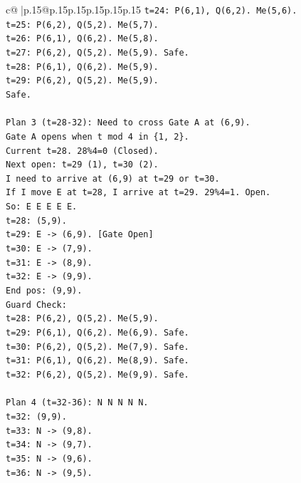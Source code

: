 \documentclass{article}
\begin{document}
{\begin{supertabular}{c@{$\;$}|p{.15\linewidth}@{}p{.15\linewidth}p{.15\linewidth}p{.15\linewidth}p{.15\linewidth}p{.15\linewidth}}
{{{\texttt{t=24: P(6,1), Q(6,2). Me(5,6).} \\
\texttt{t=25: P(6,2), Q(5,2). Me(5,7).} \\
\texttt{t=26: P(6,1), Q(6,2). Me(5,8).} \\
\texttt{t=27: P(6,2), Q(5,2). Me(5,9). Safe.} \\
\texttt{t=28: P(6,1), Q(6,2). Me(5,9).} \\
\texttt{t=29: P(6,2), Q(5,2). Me(5,9).} \\
\texttt{Safe.} \\
\\ 
\texttt{Plan 3 (t=28{-}32): Need to cross Gate A at (6,9).} \\
\texttt{Gate A opens when t mod 4 in \{1, 2\}.} \\
\texttt{Current t=28. 28\%4=0 (Closed).} \\
\texttt{Next open: t=29 (1), t=30 (2).} \\
\texttt{I need to arrive at (6,9) at t=29 or t=30.} \\
\texttt{If I move E at t=28, I arrive at t=29. 29\%4=1. Open.} \\
\texttt{So: E E E E E.} \\
\texttt{t=28: (5,9).} \\
\texttt{t=29: E {-}> (6,9). {[}Gate Open{]}} \\
\texttt{t=30: E {-}> (7,9).} \\
\texttt{t=31: E {-}> (8,9).} \\
\texttt{t=32: E {-}> (9,9).} \\
\texttt{End pos: (9,9).} \\
\texttt{Guard Check:} \\
\texttt{t=28: P(6,2), Q(5,2). Me(5,9).} \\
\texttt{t=29: P(6,1), Q(6,2). Me(6,9). Safe.} \\
\texttt{t=30: P(6,2), Q(5,2). Me(7,9). Safe.} \\
\texttt{t=31: P(6,1), Q(6,2). Me(8,9). Safe.} \\
\texttt{t=32: P(6,2), Q(5,2). Me(9,9). Safe.} \\
\\ 
\texttt{Plan 4 (t=32{-}36): N N N N N.} \\
\texttt{t=32: (9,9).} \\
\texttt{t=33: N {-}> (9,8).} \\
\texttt{t=34: N {-}> (9,7).} \\
\texttt{t=35: N {-}> (9,6).} \\
\texttt{t=36: N {-}> (9,5).} \\
}}}
\end{supertabular}}
\end{document}
